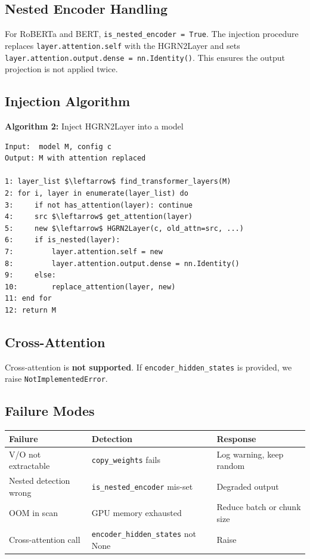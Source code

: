 \subsection{Nested Encoder Handling}

For RoBERTa and BERT, \texttt{is\_nested\_encoder = True}. The injection procedure 
replaces \texttt{layer.attention.self} with the HGRN2Layer and sets 
\texttt{layer.attention.output.dense = nn.Identity()}. This ensures the output 
projection is not applied twice.

\subsection{Injection Algorithm}

\textbf{Algorithm 2:} Inject HGRN2Layer into a model
\begin{lstlisting}
Input:  model M, config c
Output: M with attention replaced

1: layer_list $\leftarrow$ find_transformer_layers(M)
2: for i, layer in enumerate(layer_list) do
3:     if not has_attention(layer): continue
4:     src $\leftarrow$ get_attention(layer)
5:     new $\leftarrow$ HGRN2Layer(c, old_attn=src, ...)
6:     if is_nested(layer):
7:         layer.attention.self = new
8:         layer.attention.output.dense = nn.Identity()
9:     else:
10:        replace_attention(layer, new)
11: end for
12: return M
\end{lstlisting}

\subsection{Cross-Attention}

Cross-attention is \textbf{not supported}. If \texttt{encoder\_hidden\_states} is provided, 
we raise \texttt{NotImplementedError}.

\subsection{Failure Modes}

\begin{table}[H]
\centering
\small
\begin{tabular}{lll}
\toprule
\textbf{Failure} & \textbf{Detection} & \textbf{Response} \\
\midrule
V/O not extractable & \texttt{copy\_weights} fails & Log warning, keep random \\
Nested detection wrong & \texttt{is\_nested\_encoder} mis-set & Degraded output \\
OOM in scan & GPU memory exhausted & Reduce batch or chunk size \\
Cross-attention call & \texttt{encoder\_hidden\_states} not None & Raise \\
\bottomrule
\end{tabular}
\end{table}

